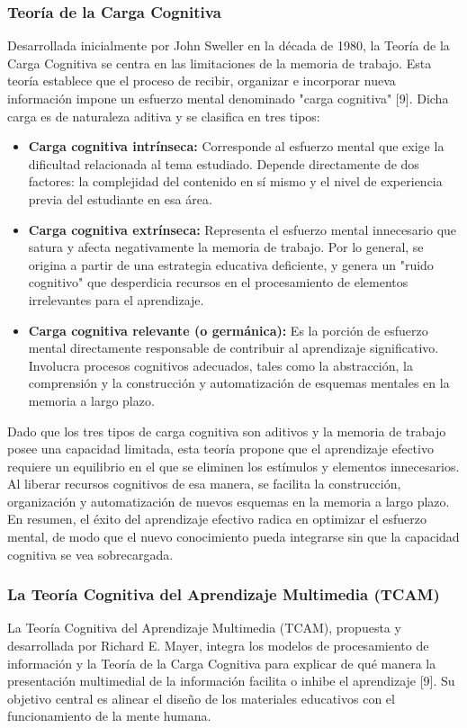 \documentclass[11pt]{article}
\begin{document}
\subsubsection*{Teoría de la Carga Cognitiva}
Desarrollada inicialmente por John Sweller en la década de 1980, la Teoría de la Carga Cognitiva se centra en las limitaciones de la memoria de trabajo. Esta teoría establece que el proceso de recibir, organizar e incorporar nueva información impone un esfuerzo mental denominado "carga cognitiva" [9]. Dicha carga es de naturaleza aditiva y se clasifica en tres tipos:

\begin{itemize}
    \item \textbf{Carga cognitiva intrínseca:} Corresponde al esfuerzo mental que exige la dificultad relacionada al tema estudiado. Depende directamente de dos factores: la complejidad del contenido en sí mismo y el nivel de experiencia previa del estudiante en esa área.
    \item \textbf{Carga cognitiva extrínseca:} Representa el esfuerzo mental innecesario que satura y afecta negativamente la memoria de trabajo. Por lo general, se origina a partir de una estrategia educativa deficiente, y genera un "ruido cognitivo" que desperdicia recursos en el procesamiento de elementos irrelevantes para el aprendizaje.
    \item \textbf{Carga cognitiva relevante (o germánica):} Es la porción de esfuerzo mental directamente responsable de contribuir al aprendizaje significativo. Involucra procesos cognitivos adecuados, tales como la abstracción, la comprensión y la construcción y automatización de esquemas mentales en la memoria a largo plazo.
\end{itemize}

Dado que los tres tipos de carga cognitiva son aditivos y la memoria de trabajo posee una capacidad limitada, esta teoría propone que el aprendizaje efectivo requiere un equilibrio en el que se eliminen los estímulos y elementos innecesarios. Al liberar recursos cognitivos de esa manera, se facilita la construcción, organización y automatización de nuevos esquemas en la memoria a largo plazo. En resumen, el éxito del aprendizaje efectivo radica en optimizar el esfuerzo mental, de modo que el nuevo conocimiento pueda integrarse sin que la capacidad cognitiva se vea sobrecargada.

\subsubsection*{La Teoría Cognitiva del Aprendizaje Multimedia (TCAM)}
La Teoría Cognitiva del Aprendizaje Multimedia (TCAM), propuesta y desarrollada por Richard E. Mayer, integra los modelos de procesamiento de información y la Teoría de la Carga Cognitiva para explicar de qué manera la presentación multimedial de la información facilita o inhibe el aprendizaje [9]. Su objetivo central es alinear el diseño de los materiales educativos con el funcionamiento de la mente humana.
\end{document}
